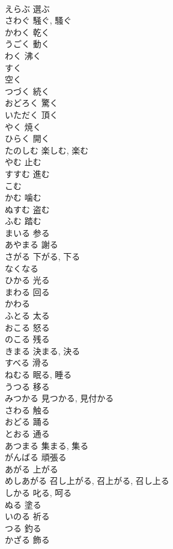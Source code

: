 \documentclass[8pt]{extreport}
\begin{document}
\begin{CJK}{UTF8}{min}
\\	えらぶ	選ぶ
\\	さわぐ	騒ぐ, 騷ぐ
\\	かわく	乾く
\\	うごく	動く
\\	わく	沸く
\\	すく	
\\	空く
\\	つづく	続く
\\	おどろく	驚く
\\	いただく	頂く
\\	やく	焼く
\\	ひらく	開く
\\	たのしむ	楽しむ, 楽む
\\	やむ	止む
\\	すすむ	進む
\\	こむ	
\\	かむ	噛む
\\	ぬすむ	盗む
\\	ふむ	踏む
\\	まいる	参る
\\	あやまる	謝る
\\	さがる	下がる, 下る
\\	なくなる	
\\	ひかる	光る
\\	まわる	回る
\\	かわる	
\\	ふとる	太る
\\	おこる	怒る
\\	のこる	残る
\\	きまる	決まる, 決る
\\	すべる	滑る
\\	ねむる	眠る, 睡る
\\	うつる	移る
\\	みつかる	見つかる, 見付かる
\\	さわる	触る
\\	おどる	踊る
\\	とおる	通る
\\	あつまる	集まる, 集る
\\	がんばる	頑張る
\\	あがる	上がる
\\	めしあがる	召し上がる, 召上がる, 召し上る
\\	しかる	叱る, 呵る
\\	ぬる	塗る
\\	いのる	祈る
\\	つる	釣る
\\	かざる	飾る

\end{CJK}
\end{document}
